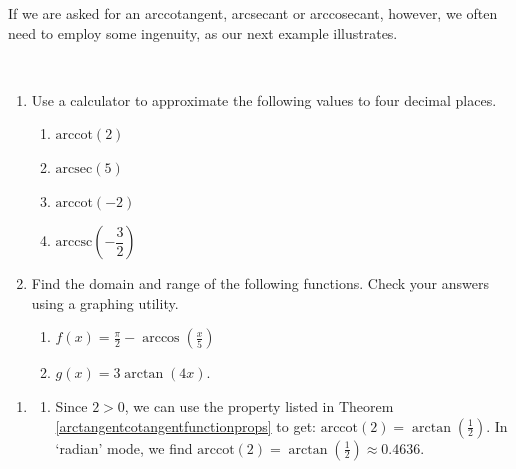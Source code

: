 \documentclass{ximera}
\begin{document}
 

If we are asked for an arccotangent, arcsecant or arccosecant, however, we often need to employ some ingenuity, as our next example illustrates.

\begin{example} \label{arcstuffoncalc} $~$

\begin{enumerate}

\item Use a calculator to approximate the following values to four decimal places.

\begin{enumerate}

\item  $\text{arccot}(2)$ 

\item  $\text{arcsec}(5)$ 

\item \label{arccotneg2} $\text{arccot}(-2)$ 

\item  $\text{arccsc}\left(-\dfrac{3}{2}\right)$

\end{enumerate}

\item  Find the domain and range of the following functions. Check your answers using a graphing utility.

\begin{enumerate}

\item  $f(x) = \frac{\pi}{2} - \arccos\left(\frac{x}{5}\right)$

\item  $g(x) = 3\arctan\left(4x \right)$. 

\end{enumerate}

\end{enumerate}


\begin{explanation}

\begin{enumerate}

\item

\begin{enumerate}

\item  Since $2 > 0$, we can use the property listed in Theorem \ref{arctangentcotangentfunctionprops} to get:  $\text{arccot}(2) = \arctan\left(\frac{1}{2}\right)$.  In `radian' mode, we find $\text{arccot}(2) = \arctan\left(\frac{1}{2}\right) \approx 0.4636$.


\end{enumerate}
\end{enumerate}
\end{explanation}
\end{example}
\end{document}
